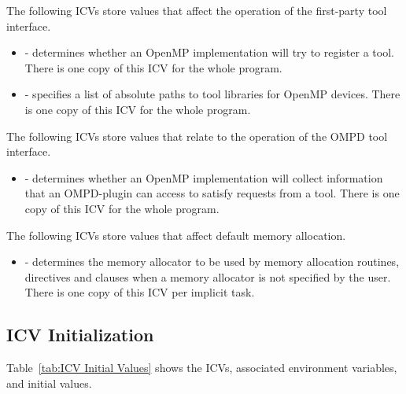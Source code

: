 The following ICVs store values that affect the operation of the
first-party tool interface.

\begin{itemize}

\item {} - determines whether an OpenMP implementation will
try to register a tool.  There is one copy of this ICV for the whole program.

\item {} - specifies a list of absolute paths to tool libraries for OpenMP devices.
There is one copy of this ICV for the whole program.

\end{itemize}

The following ICVs store values that relate to the operation of the
OMPD tool interface.

\begin{itemize}
\item
   - determines whether an OpenMP implementation will collect
  information that an OMPD-plugin can access to satisfy requests from
  a tool.
  There is one copy of this ICV for the whole program.
\end{itemize}

The following ICVs store values that affect default memory allocation.

\begin{itemize}

\item {} - determines the memory allocator to be used by memory allocation routines, directives and clauses when a memory allocator is not specified by the user. There is one copy of this ICV per implicit task.

\end{itemize}




\subsection{ICV Initialization}
\label{subsec:ICV Initialization}
Table~\ref{tab:ICV Initial Values} shows the ICVs, associated
environment variables, and initial values.

